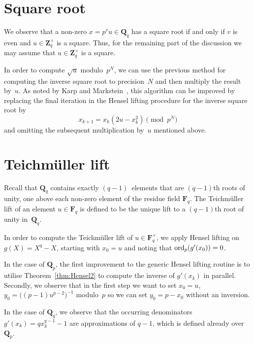\section{Square root}

We observe that a non-zero $x = p^v u \in \mathbf{Q}_q$ has a square 
root if and only if $v$ is even and $u \in \mathbf{Z}_q^{\times}$ is 
a square.  Thus, for the remaining part of the discussion we may 
assume that $u \in \mathbf{Z}_q^{\times}$ is a square.

In order to compute $\sqrt{u}$ modulo~$p^N$, we can use the previous method 
for computing the inverse square root to precision~$N$ and then multiply 
the result by~$u$.
As noted by Karp and Markstein~\citep{KarpMarkstein1997}, this algorithm 
can be improved by replacing the final iteration in the Hensel lifting 
procedure for the inverse square root by 
\begin{equation}
x_{k+1} = x_k (2 u - x_k^2) \pmod{p^N}
\end{equation}
and omitting the subsequent multiplication by~$u$ mentioned above.

\section{Teichm\"uller lift}

Recall that $\mathbf{Q}_q$ contains exactly $(q-1)$~elements that are 
$(q-1)$th roots of unity, one above each non-zero element of the residue field 
$\mathbf{F}_q$.  The Teichm\"uller lift of an element $u \in \mathbf{F}_q$ 
is defined to be the unique lift to a $(q-1)$th root of unity 
in~$\mathbf{Q}_q$.

In order to compute the Teichm\"uller lift of $u \in \mathbf{F}_q^{\times}$, 
we apply Hensel lifting on $g(X) = X^q - X$, starting with $x_0 = u$ and 
noting that $\operatorname{ord}_p(g'(x_0)) = 0$. 

\begin{rem}
In the case of $\mathbf{Q}_p$, the first improvement to the generic 
Hensel lifting routine is to utilise Theorem~\ref{thm:Hensel2} to 
compute the inverse of $g'(x_k)$ in parallel.
Secondly, we observe that in the first step we want to set 
$x_0 = u$, $y_0 = \bigl((p-1) u^{p-2}\bigr)^{-1}$ modulo~$p$ 
so we can set $y_0 = p - x_0$ without an inversion.


In the case of $\mathbf{Q}_q$, we observe that the occurring denominators 
$g'(x_k) = q x_k^{q-1} - 1$ are approximations of $q - 1$, which is defined 
already over $\mathbf{Q}_p$.
\end{rem}

